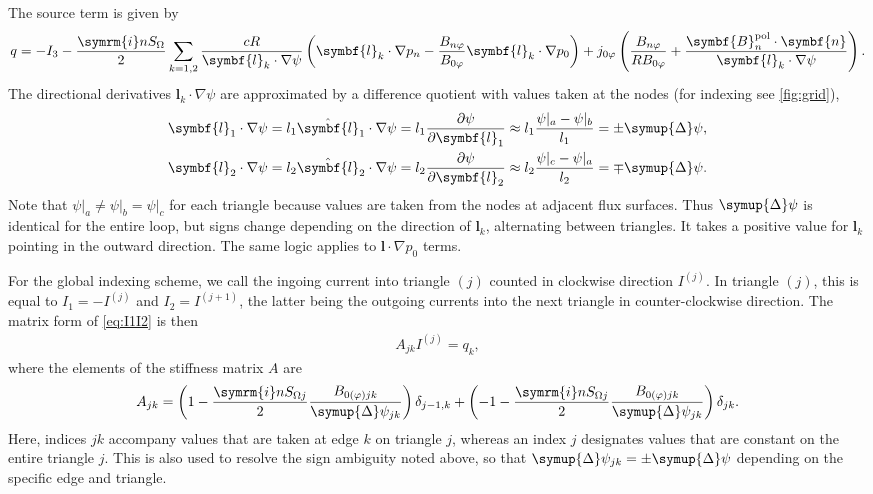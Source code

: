 \documentclass[a4paper, 10pt, english]{article}
\let\temp\vartheta
\let\vartheta\theta
\let\theta\temp
\let\temp\varphi
\let\varphi\phi
\let\phi\temp
\let\vec\symbf
\newcommand*\im{\ensuremath{\symrm{i}}}
\newcommand*\pd[2][]{\ensuremath{\frac{\partial #1}{\partial #2}}}
\newcommand*\pol{\ensuremath{\textrm{pol}}}
\begin{document}
The source term is given by
\begin{gather}
  q = -I_{3} - \frac{\im n S_{\Omega}}{2} \sum_{k = 1, 2} \frac{c R}{\vec{l}_{k} \cdot \nabla \psi} \left( \vec{l}_{k} \cdot \nabla p_{n} - \frac{B_{n \phi}}{B_{0 \phi}} \vec{l}_{k} \cdot \nabla p_{0} \right) + j_{0 \phi} \left( \frac{B_{n \phi}}{R B_{0 \phi}} + \frac{\vec{B}_{n}^{\pol} \cdot \vec{n}}{\vec{l}_{k} \cdot \nabla \psi} \right).
\end{gather}
The directional derivatives $\vec{l}_{k} \cdot \nabla \psi$ are approximated by a difference quotient with values taken at the nodes (for indexing see \cref{fig:grid}),
\begin{align}
  \vec{l}_{1} \cdot \nabla \psi = l_{1} \hat{\vec{l}}_{1} \cdot \nabla \psi = l_{1} \pd[\psi]{\vec{l}_{1}} & \approx l_{1} \frac{\psi \vert_{a} - \psi \vert_{b}}{l_{1}} = \pm \symup{\Delta} \psi, \\
  \vec{l}_{2} \cdot \nabla \psi = l_{2} \hat{\vec{l}}_{2} \cdot \nabla \psi = l_{2} \pd[\psi]{\vec{l}_{2}} & \approx l_{2} \frac{\psi \vert_{c} - \psi \vert_{a}}{l_{2}} = \mp \symup{\Delta} \psi.
\end{align}
Note that $\psi \vert_{a} \neq \psi \vert_{b} = \psi \vert_{c}$ for each triangle because values are taken from the nodes at adjacent flux surfaces. Thus $\symup{\Delta} \psi$ is identical for the entire loop, but signs change depending on the direction of $\vec{l}_{k}$, alternating between triangles. It takes a positive value for $\vec{l}_{k}$ pointing in the outward direction. The same logic applies to $\vec{l} \cdot \nabla p_{0}$ terms.

For the global indexing scheme, we call the ingoing current into triangle $(j)$ counted in clockwise direction $I^{(j)}$. In triangle $(j)$, this is equal to $I_{1} = -I^{(j)}$ and $I_{2} = I^{(j+1)}$, the latter being the outgoing currents into the next triangle in counter-clockwise direction. The matrix form of \cref{eq:I1I2} is then
\begin{gather}
  A_{jk} I^{(j)} = q_{k},
\end{gather}
where the elements of the stiffness matrix $A$ are
\begin{gather}
  A_{jk} = \left( 1 - \frac{\im n S_{\Omega j}}{2} \frac{B_{0 (\phi) jk}}{\symup{\Delta} \psi_{jk}} \right) \delta_{j - 1, k} + \left( -1 - \frac{\im n S_{\Omega j}}{2} \frac{B_{0 (\phi) jk}}{\symup{\Delta} \psi_{jk}} \right) \delta_{j k}.
\end{gather}
Here, indices $jk$ accompany values that are taken at edge $k$ on triangle $j$, whereas an index $j$ designates values that are constant on the entire triangle $j$. This is also used to resolve the sign ambiguity noted above, so that $\symup{\Delta} \psi_{jk} = \pm \symup{\Delta} \psi$ depending on the specific edge and triangle.
\end{document}
